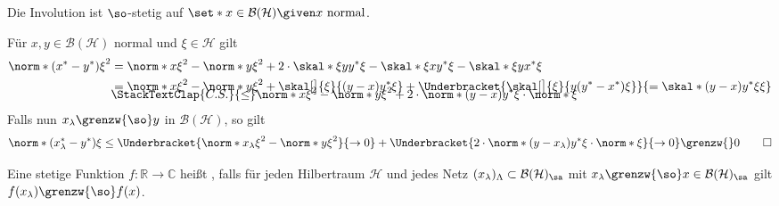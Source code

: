 \begin{proposition}[label=prop:621,{name=[Involution stark stetig auf normalen Elementen]}]
	Die Involution ist $\so$-stetig auf $\set*{x \in \mathcal{B}(\mathcal{H}) \given x \text{ normal} }$.
\end{proposition}
\begin{beweis}
	Für $x,y \in \mathcal{B}(\mathcal{H})$ normal und $\xi \in \mathcal{H}$ gilt 
	\begin{align}
		\norm*{(x^*-y^*) \xi}^2 &= \norm*{x \xi}^2 - \norm*{y \xi}^2 + 2 \cdot \skal*{\xi}{yy^* \xi} - \skal*{\xi}{xy^* \xi} - \skal*{\xi}{yx^* \xi} \\
		&= \norm*{x \xi}^2 - \norm*{y \xi}^2 + \skal[\big]{\xi}{(y-x)y^* \xi} + \Underbracket{\skal[\big]{\xi}{y(y^*-x^*)\xi}}{=\skal*{(y-x)y^* \xi}{\xi}} \\[-1em]
		&\StackTextClap{C.S.}{\le} \norm*{x \xi}^2 - \norm*{y \xi}^2 + 2 \cdot \norm*{(y-x)y^* \xi} \cdot \norm*{\xi}
	\end{align}
	Falls nun $x_\lambda \grenzw{\so} y$ in $\mathcal{B}(\mathcal{H})$, so gilt 
	\[
		\norm*{(x_\lambda^* -y^*)\xi} \le \Underbracket{\norm*{x_\lambda \xi}^2 - \norm*{y \xi}^2}{\to 0} + \Underbracket{2 \cdot \norm*{(y-x_\lambda)y^* \xi} \cdot \norm*{\xi}}{\to 0} \grenzw{} 0 \qedhere
	\]
\end{beweis}

\begin{definition}[label=def:622,{name=[{stark stetige Funktion}]}]
	Eine stetige Funktion $f \colon \mathbb{R} \to \mathbb{C}$ heißt , falls für jeden Hilbertraum $\mathcal{H}$ und jedes Netz $(x_\lambda)_\Lambda \subset \mathcal{B}(\mathcal{H})_\sa$ mit $x_\lambda \grenzw{\so} x \in \mathcal{B}(\mathcal{H})_\sa$ gilt $f(x_\lambda) \grenzw{\so}f(x)$.
\end{definition}

